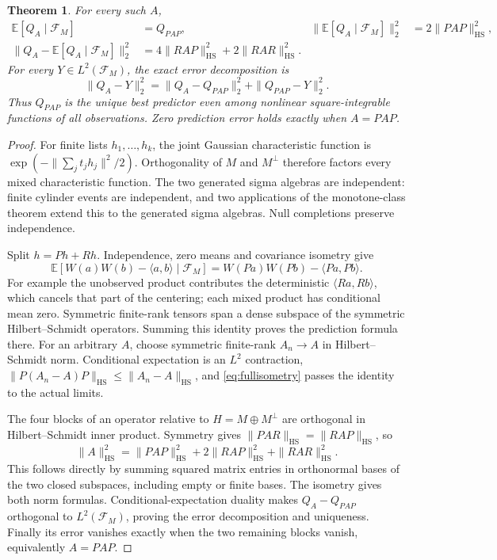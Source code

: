 \documentclass[11pt]{article}
\newtheorem{theorem}{Theorem}[section]
\newcommand{\E}{\mathbb E}
\newcommand{\HS}{\mathrm{HS}}
\begin{document}
\begin{theorem}\label{thm:matrixprediction}
For every such $A$,
\begin{align}\label{eq:matrixprediction}
 \E[Q_A\mid\mathcal F_M]&=Q_{PAP},&
 \|\E[Q_A\mid\mathcal F_M]\|_2^2&=2\|PAP\|_{\HS}^2,\\
 \|Q_A-\E[Q_A\mid\mathcal F_M]\|_2^2
 &=4\|RAP\|_{\HS}^2+2\|RAR\|_{\HS}^2.\nonumber
\end{align}
For every $Y\in L^2(\mathcal F_M)$, the exact error decomposition is
\[
 \|Q_A-Y\|_2^2=\|Q_A-Q_{PAP}\|_2^2+\|Q_{PAP}-Y\|_2^2.
\]
Thus $Q_{PAP}$ is the unique best predictor even among nonlinear
square-integrable functions of all observations. Zero prediction error
holds exactly when $A=PAP$.
\end{theorem}
\begin{proof}
For finite lists $h_1,\ldots,h_k$, the joint Gaussian characteristic
function is $\exp(-\|\sum_jt_jh_j\|^2/2)$. Orthogonality of $M$ and
$M^\perp$ therefore factors every mixed characteristic function.
The two generated sigma algebras are independent: finite cylinder events
are independent, and two applications of the monotone-class theorem
extend this to the generated sigma algebras. Null completions preserve
independence.

Split $h=Ph+Rh$. Independence, zero means and covariance isometry give
\[
 \E[W(a)W(b)-\langle a,b\rangle\mid\mathcal F_M]
 =W(Pa)W(Pb)-\langle Pa,Pb\rangle.
\]
For example the unobserved product contributes the deterministic
$\langle Ra,Rb\rangle$, which cancels that part of the centering;
each mixed product has conditional mean zero. Symmetric finite-rank
tensors span a dense subspace of the symmetric Hilbert--Schmidt
operators. Summing this identity proves the prediction formula there.
For an arbitrary $A$, choose symmetric finite-rank $A_n\to A$ in
Hilbert--Schmidt norm. Conditional expectation is an $L^2$ contraction,
$\|P(A_n-A)P\|_{\HS}\leq\|A_n-A\|_{\HS}$, and
\eqref{eq:fullisometry} passes the identity to the actual limits.

The four blocks of an operator relative to $H=M\oplus M^\perp$ are
orthogonal in Hilbert--Schmidt inner product. Symmetry gives
$\|PAR\|_{\HS}=\|RAP\|_{\HS}$, so
\[
 \|A\|_{\HS}^2=\|PAP\|_{\HS}^2
       +2\|RAP\|_{\HS}^2+\|RAR\|_{\HS}^2.
\]
This follows directly by summing squared matrix entries in orthonormal
bases of the two closed subspaces, including empty or finite bases.
The isometry gives both norm formulas. Conditional-expectation duality
makes $Q_A-Q_{PAP}$ orthogonal to $L^2(\mathcal F_M)$, proving the
error decomposition and uniqueness. Finally its error vanishes exactly
when the two remaining blocks vanish, equivalently $A=PAP$.
\end{proof}
\end{document}
